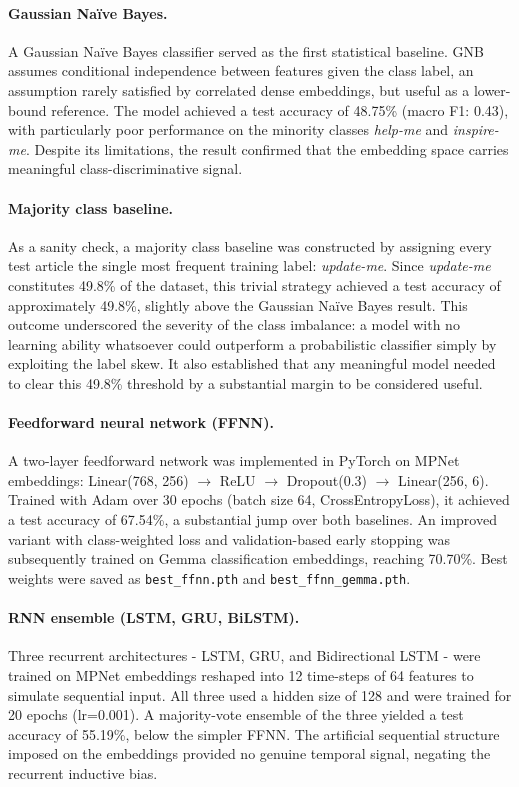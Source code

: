 \documentclass[11pt]{article}
\begin{document}
\paragraph{Gaussian Naïve Bayes.}
A Gaussian Naïve Bayes classifier served as the first statistical baseline. GNB assumes conditional independence between features given the class label, an assumption rarely satisfied by correlated dense embeddings, but useful as a lower-bound reference. The model achieved a test accuracy of 48.75\% (macro F1: 0.43), with particularly poor performance on the minority classes \textit{help-me} and \textit{inspire-me}. Despite its limitations, the result confirmed that the embedding space carries meaningful class-discriminative signal.
 
\paragraph{Majority class baseline.}
As a sanity check, a majority class baseline was constructed by assigning every test article the single most frequent training label: \textit{update-me}. Since \textit{update-me} constitutes 49.8\% of the dataset, this trivial strategy achieved a test accuracy of approximately 49.8\%, slightly above the Gaussian Naïve Bayes result. This outcome underscored the severity of the class imbalance: a model with no learning ability whatsoever could outperform a probabilistic classifier simply by exploiting the label skew. It also established that any meaningful model needed to clear this 49.8\% threshold by a substantial margin to be considered useful.
 
\paragraph{Feedforward neural network (FFNN).}
A two-layer feedforward network was implemented in PyTorch on MPNet embeddings: Linear(768, 256) $\rightarrow$ ReLU $\rightarrow$ Dropout(0.3) $\rightarrow$ Linear(256, 6). Trained with Adam over 30 epochs (batch size 64, CrossEntropyLoss), it achieved a test accuracy of 67.54\%, a substantial jump over both baselines. An improved variant with class-weighted loss and validation-based early stopping was subsequently trained on Gemma classification embeddings, reaching 70.70\%. Best weights were saved as \texttt{best\_ffnn.pth} and \texttt{best\_ffnn\_gemma.pth}.
 
\paragraph{RNN ensemble (LSTM, GRU, BiLSTM).}
Three recurrent architectures - LSTM, GRU, and Bidirectional LSTM - were trained on MPNet embeddings reshaped into 12 time-steps of 64 features to simulate sequential input. All three used a hidden size of 128 and were trained for 20 epochs (lr=0.001). A majority-vote ensemble of the three yielded a test accuracy of 55.19\%, below the simpler FFNN. The artificial sequential structure imposed on the embeddings provided no genuine temporal signal, negating the recurrent inductive bias.
 
\end{document}
